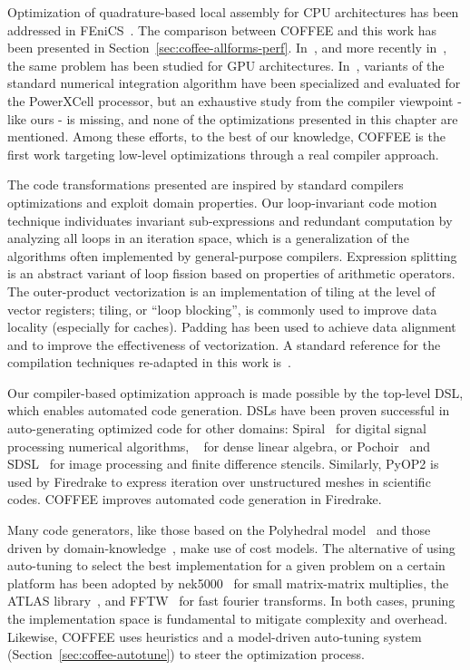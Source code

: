 Optimization of quadrature-based local assembly for CPU architectures has been addressed in FEniCS~\cite{quadrature-olegaard}. The comparison between COFFEE and this work has been presented in Section~\ref{sec:coffee-allforms-perf}. In~\citep{Markall20101815}, and more recently in~\citep{petsc-integration-gpu}, the same problem has been studied for GPU architectures. In~\citep{assembly-opencl}, variants of the standard numerical integration algorithm have been specialized and evaluated for the PowerXCell processor, but an exhaustive study from the compiler viewpoint - like ours - is missing, and none of the optimizations presented in this chapter are mentioned. Among these efforts, to the best of our knowledge, COFFEE is the first work targeting low-level optimizations through a real compiler approach.

The code transformations presented are inspired by standard compilers optimizations and exploit domain properties. Our loop-invariant code motion technique individuates invariant sub-expressions and redundant computation by analyzing all loops in an iteration space, which is a generalization of the algorithms often implemented by general-purpose compilers. Expression splitting is an abstract variant of loop fission based on properties of arithmetic operators. The outer-product vectorization is an implementation of tiling at the level of vector registers; tiling, or ``loop blocking'', is commonly used to improve data locality (especially for caches). Padding has been used to achieve data alignment and to improve the effectiveness of vectorization. A standard reference for the compilation techniques re-adapted in this work is~\citep{dragonbook}.

Our compiler-based optimization approach is made possible by the top-level DSL, which enables automated code generation. DSLs have been proven successful in auto-generating optimized code for other domains: Spiral~\citep{Pueschel:05} for digital signal processing numerical algorithms, ~\citep{Spampinato:14} for dense linear algebra, or Pochoir~\cite{pochoir} and SDSL~\cite{stencil-compiler} for image processing and finite difference stencils. Similarly, PyOP2 is used by Firedrake to express iteration over unstructured meshes in scientific codes. COFFEE improves automated code generation in Firedrake.

Many code generators, like those based on the Polyhedral model~\cite{pluto} and those driven by domain-knowledge~\cite{modeldriven}, make use of cost models. The alternative of using auto-tuning to select the best implementation for a given problem on a certain platform has been adopted by nek5000~\cite{nek5000} for small matrix-matrix multiplies, the ATLAS library~\cite{ATLAS}, and FFTW~\cite{FFTW} for fast fourier transforms. In both cases, pruning the implementation space is fundamental to mitigate complexity and overhead. Likewise, COFFEE uses heuristics and a model-driven auto-tuning system (Section~\ref{sec:coffee-autotune}) to steer the optimization process.


